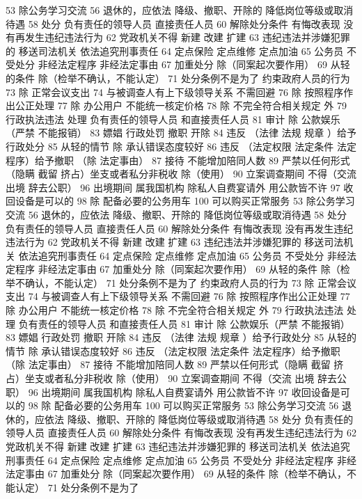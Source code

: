 \documentclass[11pt]{ctexart}
\begin{document}
53 除公务学习交流
56 退休的，应依法
降级、撤职、开除的 降低岗位等级或取消待遇
58 处分
负有责任的领导人员
直接责任人员
60 解除处分条件
有悔改表现
没有再发生违纪违法行为
62 党政机关不得
新建 改建 扩建
63 违纪违法并涉嫌犯罪的
移送司法机关
依法追究刑事责任
64 定点保险 定点维修 定点加油
65 公务员 不受处分
非经法定程序
非经法定事由
67 加重处分
除（同案起次要作用）
69 从轻的条件
除（检举不确认，不能认定）
71 处分条例不是为了
约束政府人员的行为
73 除 正常会议支出
74 与被调查人有上下级领导关系 不需回避
76 除 按照程序作出公正处理
77 除 办公用户
不能统一核定价格
78 除 不完全符合相关规定 外
79 行政执法违法 处理
负有责任的领导人员
和直接责任人员
81 审计
除 公款娱乐（严禁 不能报销）
83 嫖娼 行政处罚
撤职 开除
84 违反 （法律 法规 规章 ）给予行政处分
85 从轻的情节
除 承认错误态度较好
86 违反 （法定权限 法定条件 法定程序）给予撤职
（除 法定事由）
87 接待 不能增加陪同人数
89 严禁以任何形式（隐瞒 截留 挤占）坐支或者私分非税收
除（使用）
90 立案调查期间 不得（交流 出境 辞去公职）
96 出境期间 属我国机构 除私人自费宴请外 用公款皆不许
97 收回设备是可以的
98 除 配备必要的公务用车
100 可以购买正常服务
53 除公务学习交流
56 退休的，应依法
降级、撤职、开除的 降低岗位等级或取消待遇
58 处分
负有责任的领导人员
直接责任人员
60 解除处分条件
有悔改表现
没有再发生违纪违法行为
62 党政机关不得
新建 改建 扩建
63 违纪违法并涉嫌犯罪的
移送司法机关
依法追究刑事责任
64 定点保险 定点维修 定点加油
65 公务员 不受处分
非经法定程序
非经法定事由
67 加重处分
除（同案起次要作用）
69 从轻的条件
除（检举不确认，不能认定）
71 处分条例不是为了
约束政府人员的行为
73 除 正常会议支出
74 与被调查人有上下级领导关系 不需回避
76 除 按照程序作出公正处理
77 除 办公用户
不能统一核定价格
78 除 不完全符合相关规定 外
79 行政执法违法 处理
负有责任的领导人员
和直接责任人员
81 审计
除 公款娱乐（严禁 不能报销）
83 嫖娼 行政处罚
撤职 开除
84 违反 （法律 法规 规章 ）给予行政处分
85 从轻的情节
除 承认错误态度较好
86 违反 （法定权限 法定条件 法定程序）给予撤职
（除 法定事由）
87 接待 不能增加陪同人数
89 严禁以任何形式（隐瞒 截留 挤占）坐支或者私分非税收
除（使用）
90 立案调查期间 不得（交流 出境 辞去公职）
96 出境期间 属我国机构 除私人自费宴请外 用公款皆不许
97 收回设备是可以的
98 除 配备必要的公务用车
100 可以购买正常服务
53 除公务学习交流
56 退休的，应依法
降级、撤职、开除的 降低岗位等级或取消待遇
58 处分
负有责任的领导人员
直接责任人员
60 解除处分条件
有悔改表现
没有再发生违纪违法行为
62 党政机关不得
新建 改建 扩建
63 违纪违法并涉嫌犯罪的
移送司法机关
依法追究刑事责任
64 定点保险 定点维修 定点加油
65 公务员 不受处分
非经法定程序
非经法定事由
67 加重处分
除（同案起次要作用）
69 从轻的条件
除（检举不确认，不能认定）
71 处分条例不是为了
\end{document}
